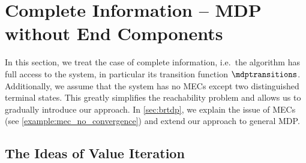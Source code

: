 \documentclass{theoretics}
\begin{document}
 	\section{Complete Information -- MDP without End Components} \label{sec:brtdp_no_ec}

In this section, we treat the case of complete information, i.e.\ the algorithm has full access to the system, in particular its transition function $\mdptransitions$.
Additionally, we assume that the system has no MECs except two distinguished terminal states.
This greatly simplifies the reachability problem and allows us to gradually introduce our approach.
In \cref{sec:brtdp}, we explain the issue of MECs (see \cref{example:mec_no_convergence}) and extend our approach to general MDP.

\subsection{The Ideas of Value Iteration}
\end{document}
